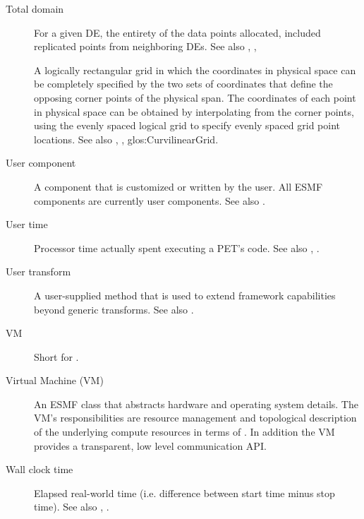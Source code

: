 \begin{description}
\label{glos:TotDomain} 
\item[Total domain] 
  For a given DE, the entirety 
  of the data points allocated, included replicated points from neighboring
  DEs.  See also , 
  , 

\label{glos:UniformGrid}
  A logically rectangular grid in which the coordinates in physical 
  space can be completely specified by the two sets of coordinates
  that define the opposing corner points of the physical span.  The coordinates
  of each point in physical space can be obtained by interpolating from
  the corner points, using the evenly spaced logical grid to specify 
  evenly spaced grid point locations.  See also 
  ,
  , 
  {glos:CurvilinearGrid}.  

\label{glos:UserComp} 
\item[User component] 
  A component that is customized or
  written by the user.  All ESMF components are currently user components.
  See also .

\label{glos:UserTime} 
\item[User time] 
  Processor time actually spent executing 
  a PET's code. See also , 
  .

\label{glos:UserTrans} 
\item[User transform] 
  A user-supplied 
  method that is used to extend framework capabilities beyond generic 
  transforms. See also . 

\label{glos:VM} 
\item[VM] 
  Short for .

\label{glos:VMachine} 
\item[Virtual Machine (VM)] 
  An ESMF class that abstracts hardware and 
  operating system details. The VM's responsibilities are resource management
  and topological description of the underlying compute resources in terms of 
  . In addition the VM provides a transparent, low level
  communication API. 

\label{glos:WallClockTime} 
\item [Wall clock time] 
  Elapsed real-world time 
  (i.e. difference between start time minus stop time).
  See also , .

\end{description}
